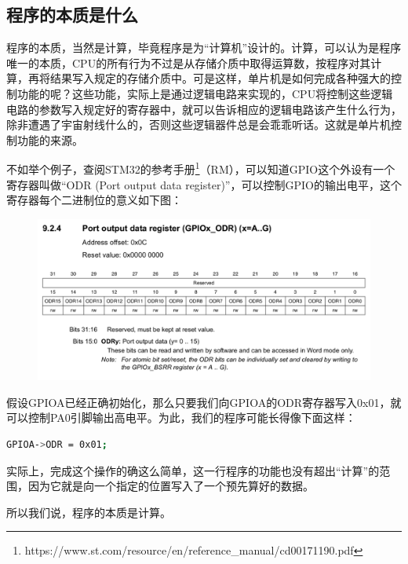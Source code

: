 \subsection{程序的本质是什么}
程序的本质，当然是计算，毕竟程序是为“计算机”设计的。计算，可以认为是程序唯一的本质，CPU的所有行为不过是从存储介质中取得运算数，按程序对其计算，再将结果写入规定的存储介质中。可是这样，单片机是如何完成各种强大的控制功能的呢？这些功能，实际上是通过逻辑电路来实现的，CPU将控制这些逻辑电路的参数写入规定好的寄存器中，就可以告诉相应的逻辑电路该产生什么行为，除非遭遇了宇宙射线什么的，否则这些逻辑器件总是会乖乖听话。这就是单片机控制功能的来源。
\par 
不如举个例子，查阅STM32的参考手册\footnote{https://www.st.com/resource/en/reference\_manual/cd00171190.pdf}（\ac{RM}），可以知道GPIO这个外设有一个寄存器叫做“ODR (Port output data register)”，可以控制GPIO的输出电平，这个寄存器每个二进制位的意义如下图：
\par 
\begin{figure}[h]
	\includegraphics[width=\textwidth]{images/content/ODR.png}
	\label{odrReg}
\end{figure}
\par 
假设GPIOA已经正确初始化，那么只要我们向GPIOA的ODR寄存器写入0x01，就可以控制PA0引脚输出高电平。为此，我们的程序可能长得像下面这样：
\par 
\begin{lstlisting}[language=bash, style=customStyleC, caption=控制PA0输出高电平]
GPIOA->ODR = 0x01;
\end{lstlisting}
\par 
实际上，完成这个操作的确这么简单，这一行程序的功能也没有超出“计算”的范围，因为它就是向一个指定的位置写入了一个预先算好的数据。
\par 
所以我们说，程序的本质是计算。

